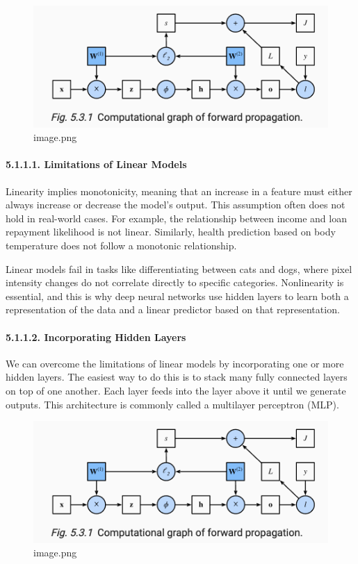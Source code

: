 \documentclass[11pt]{article}
\begin{document}
\begin{figure}
\centering
\includegraphics[keepaspectratio]{main_files/image.png}
\caption{image.png}
\end{figure}

    \paragraph{5.1.1.1. Limitations of Linear \mbox{}
Models}\label{limitations-of-linear-models}

    Linearity implies monotonicity, meaning that an increase in a feature
must either always increase or decrease the model's output. This
assumption often does not hold in real-world cases. For example, the
relationship between income and loan repayment likelihood is not linear.
Similarly, health prediction based on body temperature does not follow a
monotonic relationship.

Linear models fail in tasks like differentiating between cats and dogs,
where pixel intensity changes do not correlate directly to specific
categories. Nonlinearity is essential, and this is why deep neural
networks use hidden layers to learn both a representation of the data
and a linear predictor based on that representation.

    \paragraph{5.1.1.2. Incorporating Hidden \mbox{}
Layers}\label{incorporating-hidden-layers}

    We can overcome the limitations of linear models by incorporating one or
more hidden layers. The easiest way to do this is to stack many fully
connected layers on top of one another. Each layer feeds into the layer
above it until we generate outputs. This architecture is commonly called
a multilayer perceptron (MLP).

\begin{figure}
\centering
\includegraphics[keepaspectratio]{main_files/image.png}
\caption{image.png}
\end{figure}
\end{document}
